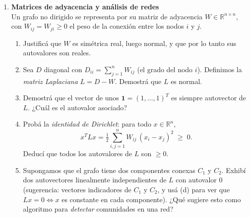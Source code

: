 \begin{enumerate}
\item {\bf Matrices de adyacencia y análisis de redes}\\
Un grafo no dirigido se representa por su matriz de adyacencia
$W \in \mathbb{R}^{n \times n}$, con $W_{ij}=W_{ji}\ge 0$ el peso de la conexión
entre los nodos $i$ y $j$.
\begin{enumerate}[label=\alph*)]
    \item Justificá que $W$ es simétrica real, luego normal, y que por lo tanto
          sus autovalores son reales.   %
    \item Sea $D$ diagonal con $D_{ii}=\sum_{j=1}^{n}W_{ij}$ (el grado del nodo $i$).
          Definimos la \emph{matriz Laplaciana} $L=D-W$. Demostrá que $L$ es normal.
    \item Demostrá que el vector de unos $\mathbf{1}=(1,\dots,1)^{T}$ es siempre
          autovector de $L$. ¿Cuál es el autovalor asociado?
    \item Probá la \emph{identidad de Dirichlet}: para todo $x\in\mathbb{R}^{n}$,   %
          \[
            x^{T}Lx=\tfrac12\sum_{i,j=1}^{n}W_{ij}\,(x_i-x_j)^{2}\;\ge\;0 .
          \]
          Deducí que todos los autovalores de $L$ son $\ge 0$.
    \item Supongamos que el grafo tiene dos componentes conexas $C_1$ y $C_2$.
          Exhibí dos autovectores linealmente independientes de $L$ con autovalor $0$
          (sugerencia: vectores indicadores de $C_1$ y $C_2$, y usá (d) para ver que
          $Lx=0 \iff x$ es constante en cada componente). ¿Qué sugiere esto como
          algoritmo para \emph{detectar} comunidades en una red?   %
\end{enumerate}


\end{enumerate}
